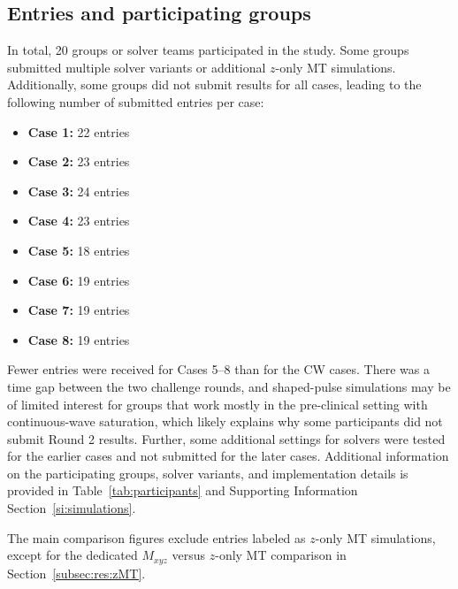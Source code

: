\documentclass[11pt,a4paper]{article}
\begin{document}
\subsection{Entries and participating groups}
In total, 20 groups or solver teams participated in the study. Some groups submitted multiple solver variants or additional $z$-only MT simulations. Additionally, some groups did not submit results for all cases, leading to the following number of submitted entries per case:
\begin{itemize}
\item \textbf{Case 1:} 22 entries
\item \textbf{Case 2:} 23 entries
\item \textbf{Case 3:} 24 entries
\item \textbf{Case 4:} 23 entries
\item \textbf{Case 5:} 18 entries
\item \textbf{Case 6:} 19 entries
\item \textbf{Case 7:} 19 entries
\item \textbf{Case 8:} 19 entries
\end{itemize}
Fewer entries were received for Cases 5--8 than for the CW cases. There was a time gap between the two challenge rounds, and shaped-pulse simulations may be of limited interest for groups that work mostly in the pre-clinical setting with continuous-wave saturation, which likely explains why some participants did not submit Round 2 results. Further, some additional settings for solvers were tested for the earlier cases and not submitted for the later cases.
Additional information on the participating groups, solver variants, and implementation details is provided in Table~\ref{tab:participants} and Supporting Information Section~\ref{si:simulations}.

The main comparison figures exclude entries labeled as $z$-only MT simulations, except for the dedicated $M_{xyz}$ versus $z$-only MT comparison in Section~\ref{subsec:res:zMT}.
\end{document}
